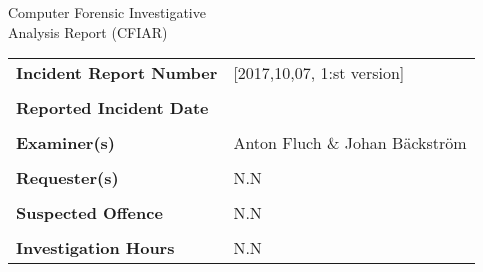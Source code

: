 


\setlength\headsep{50pt}
{\centering \Huge Computer Forensic Investigative \\Analysis Report (CFIAR)

}

\begin{longtable}{p{}p{}}
\textbf{Incident Report Number} & [2017,10,07, 1:st version] \\
&\\
\textbf{Reported Incident Date} & \\
&\\
\textbf{Examiner(s)} & Anton Fluch \& Johan Bäckström \\
&\\
\textbf{Requester(s)} & N.N \\
&\\
\textbf{Suspected Offence} & N.N \\
&\\
\textbf{Investigation Hours} & N.N
\end{longtable}

\clearpage

